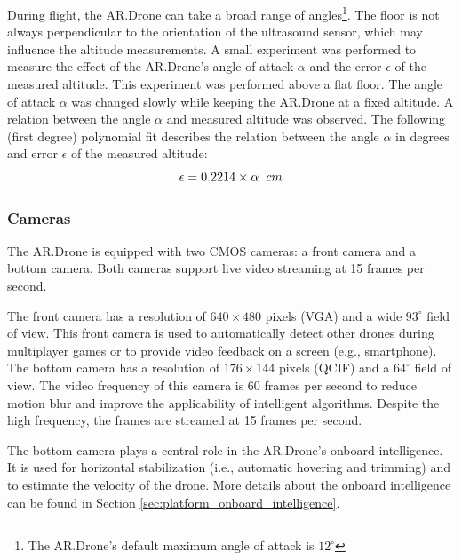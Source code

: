 During flight, the AR.Drone can take a broad range of angles\footnote{The AR.Drone's default maximum angle of attack is $12^{\circ}$}.
The floor is not always perpendicular to the orientation of the ultrasound sensor, which may influence the altitude measurements.
A small experiment was performed to measure the effect of the AR.Drone's angle of attack $\alpha$ and the error $\epsilon$ of the measured altitude.
This experiment was performed above a flat floor.
The angle of attack $\alpha$ was changed slowly while keeping the AR.Drone at a fixed altitude.
A relation between the angle $\alpha$ and measured altitude was observed.
The following (first degree) polynomial fit describes the relation between the angle $\alpha$ in degrees and error $\epsilon$ of the measured altitude:
\begin{equation}
\epsilon = 0.2214 \times \alpha \hspace{0.2cm} \begin{small}cm\end{small}
\end{equation}
\normalsize
\normalcolor



\subsubsection{Cameras}
The AR.Drone is equipped with two CMOS cameras: a front camera and a bottom camera.
Both cameras support live video streaming at 15 frames per second.

The front camera has a resolution of $640 \times 480$ pixels (VGA) and a wide $93^{\circ}$ field of view.
This front camera is used to automatically detect other drones during multiplayer games or to provide video feedback on a screen (e.g., smartphone).
The bottom camera has a resolution of $176 \times 144$ pixels (QCIF) and a $64^{\circ}$ field of view.
The video frequency of this camera is 60 frames per second to reduce motion blur and improve the applicability of intelligent algorithms.
Despite the high frequency, the frames are streamed at 15 frames per second.


The bottom camera plays a central role in the AR.Drone's onboard intelligence.
It is used for horizontal stabilization (i.e., automatic hovering and trimming) and to estimate the velocity of the drone.
More details about the onboard intelligence can be found in Section \ref{sec:platform_onboard_intelligence}.



